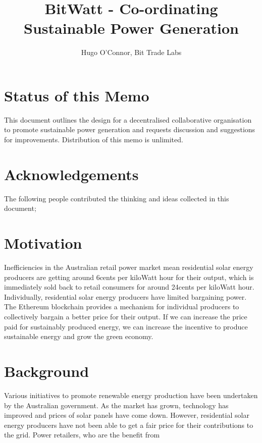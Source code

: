 \documentclass[12pt,twocolumn]{article}
\begin{document}
\title{BitWatt - Co-ordinating Sustainable Power Generation}
\author{Hugo O'Connor, Bit Trade Labs}
\maketitle
\tableofcontents
\newpage
\section {Status of this Memo}

This document outlines the design for a decentralised collaborative organisation to promote sustainable power generation and requests discussion and suggestions for improvements. Distribution of this memo is unlimited.

\section {Acknowledgements}

The following people contributed the thinking and ideas collected in this document;

\section {Motivation}

Inefficiencies in the Australian retail power market mean residential solar energy producers are getting around 6cents per kiloWatt hour for their output, which is immediately sold back to retail consumers for around 24cents per kiloWatt hour. Individually, residential solar energy producers have limited bargaining power. The Ethereum blockchain provides a mechanism for individual producers to collectively bargain a better price for their output. If we can increase the price paid for sustainably produced energy, we can increase the incentive to produce sustainable energy and grow the green economy.

\section {Background}

Various initiatives to promote renewable energy production have been undertaken by the Australian government.  As the market has grown, technology has improved and prices of solar panels have come down. However, residential solar energy producers have not been able to get a fair price for their contributions to the grid. Power retailers, who are the benefit from
\end{document}
